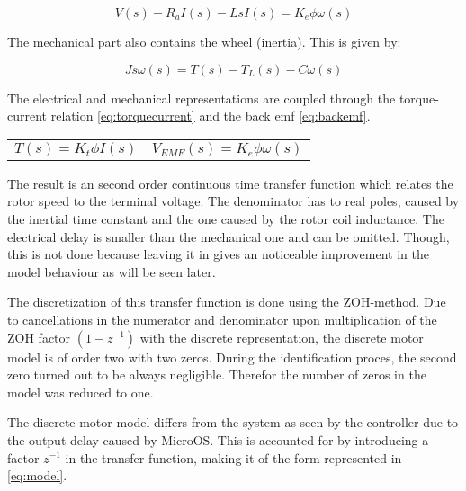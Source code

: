 \documentclass[a4paper]{article}
\newcommand{\newpar}{\vspace{.3cm}\noindent}
\begin{document}
\begin{equation}
    V(s)-R_{a} I(s)-L s I(s)=K_{e} \phi \omega(s)
    \label{eq:electrical}
\end{equation}

\newpar
The mechanical part also contains the wheel (inertia). This is given by:

\begin{equation}
    J s \omega(s)=T(s)-T_{L}(s)-C \omega(s)
    \label{eq:mech}
\end{equation}

\newpar
The electrical and mechanical representations are coupled through the torque-current relation \autoref{eq:torquecurrent} and the back emf \autoref{eq:backemf}.
\begin{center}
    \begin{tabular}{p{5cm}p{5cm}}
        \begin{equation}
            T(s)=K_{t} \phi I(s)
            \label{eq:torquecurrent}
        \end{equation}
        &  
        \begin{equation}
            V_{EMF}(s)=K_{e} \phi \omega(s)
            \label{eq:backemf}
        \end{equation}
        
    \end{tabular}
\end{center}

\newpar
The result is an second order continuous time transfer function which relates the rotor speed to the terminal voltage. The denominator has to real poles, caused by the inertial time constant and the one caused by the rotor coil inductance. The electrical delay is smaller than the mechanical one and can be omitted. Though, this is not done because leaving it in gives an noticeable improvement in the model behaviour as will be seen later.

\newpar
The discretization of this transfer function is done using the ZOH-method. Due to cancellations in the numerator and denominator upon multiplication of the ZOH factor \((1-z^{-1})\) with the discrete representation, the discrete motor model is of order two with two zeros. During the identification proces, the second zero turned out to be always negligible. Therefor the number of zeros in the model was reduced to one. 

\newpar
The discrete motor model differs from the system as seen by the controller due to the output delay caused by MicroOS. This is accounted for by introducing a factor \(z^{-1}\) in the transfer function, making it of the form represented in \autoref{eq:model}.
\end{document}
